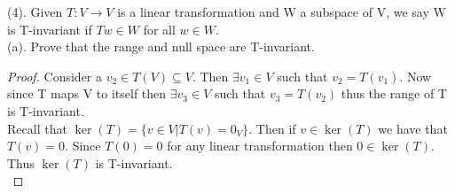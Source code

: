\documentclass[a4paper, 11pt]{article}
\newenvironment{solution}{%
	\begin{list}{}{%
			\setlength{\topsep}{0pt}%
			\setlength{\leftmargin}{1.5cm}%
			\setlength{\rightmargin}{1.5cm}%
			\setlength{\listparindent}{\parindent}%
			\setlength{\itemindent}{\parindent}%
			\setlength{\parsep}{\parskip}%
		}%
		\item[]}{\end{list}}
\begin{document}
\noindent(4). Given $T:V\to V$ is a linear transformation and W a subspace of V, we say W is T-invariant if $Tw \in W$ for all $w \in W$. \\

\noindent(a). Prove that the range and null space are T-invariant. \\
	\begin{solution}
		\begin{proof}
			\noindent Consider a $v_2\in T(V)\subseteq V$. Then $\exists v_1 \in V$ such that $v_2 = T(v_1)$. Now since T maps V to itself then $\exists v_3 \in V$ such that $v_3 = T(v_2)$ thus the range of T is T-invariant. \\ 
			
			\noindent Recall that $\ker(T) = \{v\in V | T(v) = 0_V\}$. Then if $v\in\ker(T)$ we have that $T(v) = 0$. Since $T(0)=0$ for any linear transformation then $0\in\ker(T)$. Thus $\ker(T)$ is T-invariant. \\
		\end{proof}
	\end{solution}
\end{document}
